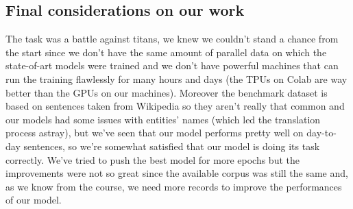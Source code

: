 \subsection{Final considerations on our work}
The task was a battle against titans, we knew we couldn't stand a chance from the start since we don't have the same amount of parallel data on which the state-of-art models were trained and we don't have powerful machines that can run the training flawlessly for many hours and days (the TPUs on Colab are way better than the GPUs on our machines). Moreover the benchmark dataset is based on sentences taken from Wikipedia so they aren't really that common and our models had some issues with entities' names (which led the translation process astray), but we've seen that our model performs pretty well on day-to-day sentences, so we're somewhat satisfied that our model is doing its task correctly. We've tried to push the best model for more epochs but the improvements were not so great since the available corpus was still the same and, as we know from the course, we need more records to improve the performances of our model.
\vspace{3mm}

